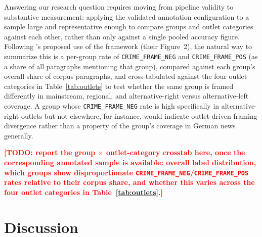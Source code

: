 \documentclass[a4paper,oneside,bibliography=totoc]{scrartcl}
\newcommand{\todo}[1]{\textcolor{red}{\textbf{[TODO: #1]}}}
\begin{document}
Answering our research question requires moving from pipeline validity to substantive measurement: applying the validated annotation configuration to a sample large and representative enough to compare groups and outlet categories against each other, rather than only against a single pooled accuracy figure. Following \citeauthor{freudenthaler2025}'s proposed use of the framework (their Figure~2), the natural way to summarize this is a per-group rate of \texttt{CRIME\_FRAME\_NEG} and \texttt{CRIME\_FRAME\_POS} (as a share of all paragraphs mentioning that group), compared against each group's overall share of corpus paragraphs, and cross-tabulated against the four outlet categories in Table~\ref{tab:outlets} to test whether the same group is framed differently in mainstream, regional, and alternative-right versus alternative-left coverage. A group whose \texttt{CRIME\_FRAME\_NEG} rate is high specifically in alternative-right outlets but not elsewhere, for instance, would indicate outlet-driven framing divergence rather than a property of the group's coverage in German news generally.

\todo{report the group $\times$ outlet-category crosstab here, once the corresponding annotated sample is available: overall label distribution, which groups show disproportionate \texttt{CRIME\_FRAME\_NEG}/\texttt{CRIME\_FRAME\_POS} rates relative to their corpus share, and whether this varies across the four outlet categories in Table~\ref{tab:outlets}.}

\section{Discussion}
\label{sec:discussion}
\end{document}
